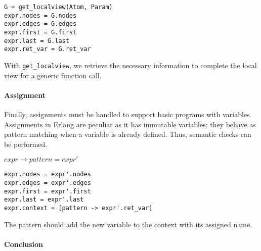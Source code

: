 \begin{verbatim}
G = get_localview(Atom, Param)
expr.nodes = G.nodes
expr.edges = G.edges
expr.first = G.first
expr.last = G.last
expr.ret_var = G.ret_var 
\end{verbatim}

With \texttt{get\_localview}, we retrieve the necessary information  
to complete the local view for a generic function call.  

\paragraph{Assignment}  
Finally, assignments must be handled to support basic programs  
with variables. Assignments in Erlang are peculiar as it has
immutable variables: they behave  
as pattern matching when a variable is already defined.
Thus, semantic checks can be performed.  

\bigskip

\noindent $expr \to pattern = expr'$

\begin{verbatim}
expr.nodes = expr'.nodes
expr.edges = expr'.edges
expr.first = expr'.first
expr.last = expr'.last
expr.context = [pattern -> expr'.ret_var]
\end{verbatim}

The pattern should add the new variable to the context  
with its assigned name.  

\paragraph{Conclusion}
